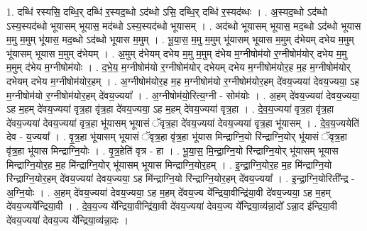\documentclass[17pt]{extarticle}
\begin{document}
1. दब्धि॑ रस्यसि॒ दब्धि॒र् दब्धि॑ र॒स्यद॒ब्धो ऽद॑ब्धो ऽसि॒ दब्धि॒र् दब्धि॑ र॒स्यद॑ब्धः । . अ॒स्यद॒ब्धो ऽद॑ब्धो ऽस्य॒स्यद॑ब्धो भूयासम् भूयास॒ मद॑ब्धो ऽस्य॒स्यद॑ब्धो भूयासम् । . अद॑ब्धो भूयासम् भूयास॒ मद॒ब्धो ऽद॑ब्धो भूयास म॒मु म॒मुम् भू॑यास॒ मद॒ब्धो ऽद॑ब्धो भूयास म॒मुम् । . भू॒या॒स॒ म॒मु म॒मुम् भू॑यासम् भूयास म॒मुम् द॑भेयम् दभेय म॒मुम् भू॑यासम् भूयास म॒मुम् द॑भेयम् । . अ॒मुम् द॑भेयम् दभेय म॒मु म॒मुम् द॑भेय म॒ग्नीषोम॑यो र॒ग्नीषोम॑योर् दभेय म॒मु म॒मुम् द॑भेय म॒ग्नीषोम॑योः । . द॒भे॒य॒ म॒ग्नीषोम॑यो र॒ग्नीषोम॑योर् दभेयम् दभेय म॒ग्नीषोम॑योर॒ह म॒ह म॒ग्नीषोम॑योर् दभेयम् दभेय म॒ग्नीषोम॑योर॒हम् । . अ॒ग्नीषोम॑योर॒ह म॒ह म॒ग्नीषोम॑यो र॒ग्नीषोम॑योर॒हम् दे॑वय॒ज्यया॑ देवय॒ज्यया॒ ऽह म॒ग्नीषोम॑यो र॒ग्नीषोम॑योर॒हम् दे॑वय॒ज्यया᳚ । . अ॒ग्नीषोम॑यो॒रित्य॒ग्नी - सोम॑योः । . अ॒हम् दे॑वय॒ज्यया॑ देवय॒ज्यया॒ ऽह म॒हम् दे॑वय॒ज्यया॑ वृत्र॒हा वृ॑त्र॒हा दे॑वय॒ज्यया॒ ऽह म॒हम् दे॑वय॒ज्यया॑ वृत्र॒हा । . दे॒व॒य॒ज्यया॑ वृत्र॒हा वृ॑त्र॒हा दे॑वय॒ज्यया॑ देवय॒ज्यया॑ वृत्र॒हा भू॑यासम् भूयासं ॅवृत्र॒हा दे॑वय॒ज्यया॑ देवय॒ज्यया॑ वृत्र॒हा भू॑यासम् । . दे॒व॒य॒ज्ययेति॑ देव - य॒ज्यया᳚ । . वृ॒त्र॒हा भू॑यासम् भूयासं ॅवृत्र॒हा वृ॑त्र॒हा भू॑यास मिन्द्राग्नि॒यो रि॑न्द्राग्नि॒योर् भू॑यासं ॅवृत्र॒हा वृ॑त्र॒हा भू॑यास मिन्द्राग्नि॒योः । . वृ॒त्र॒हेति॑ वृत्र - हा । . भू॒या॒स॒ मि॒न्द्रा॒ग्नि॒यो रि॑न्द्राग्नि॒योर् भू॑यासम् भूयास मिन्द्राग्नि॒योर॒ह म॒ह मि॑न्द्राग्नि॒योर् भू॑यासम् भूयास मिन्द्राग्नि॒योर॒हम् । . इ॒न्द्रा॒ग्नि॒योर॒ह म॒ह मि॑न्द्राग्नि॒यो रि॑न्द्राग्नि॒योर॒हम् दे॑वय॒ज्यया॑ देवय॒ज्यया॒ ऽह मि॑न्द्राग्नि॒यो रि॑न्द्राग्नि॒योर॒हम् दे॑वय॒ज्यया᳚ । . इ॒न्द्रा॒ग्नि॒योरिती᳚न्द्र - अ॒ग्नि॒योः । . अ॒हम् दे॑वय॒ज्यया॑ देवय॒ज्यया॒ ऽह म॒हम् दे॑वय॒ज्य ये᳚न्द्रिया॒वीन्द्रि॑या॒वी दे॑वय॒ज्यया॒ ऽह म॒हम् दे॑वय॒ज्यये᳚न्द्रिया॒वी । . दे॒व॒य॒ज्य ये᳚न्द्रिया॒वीन्द्रि॑या॒वी दे॑वय॒ज्यया॑ देवय॒ज्य ये᳚न्द्रिया॒व्य॑न्ना॒दो᳚ ऽन्ना॒द इ॑न्द्रिया॒वी दे॑वय॒ज्यया॑ देवय॒ज्य ये᳚न्द्रिया॒व्य॑न्ना॒दः । \newline
\end{document}
